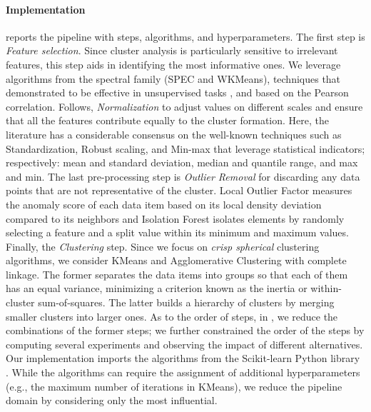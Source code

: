 \paragraph{Implementation}  reports the pipeline with steps, algorithms, and hyperparameters.
The first step is \textit{Feature selection}.
Since cluster analysis is particularly sensitive to irrelevant features, this step aids in identifying the most informative ones.
We leverage algorithms from the spectral family (SPEC and WKMeans), techniques that demonstrated to be effective in unsupervised tasks \cite{alelyani2018feature}, and based on the Pearson correlation.
Follows, \textit{Normalization} to adjust values on different scales and ensure that all the features contribute equally to the cluster formation.
Here, the literature has a considerable consensus on the well-known techniques such as Standardization, Robust scaling, and Min-max that leverage statistical indicators; respectively: mean and standard deviation, median and quantile range, and max and min.
The last pre-processing step is \textit{Outlier Removal} for discarding any data points that are not representative of the cluster.
Local Outlier Factor \cite{breunig2000lof} measures the anomaly score of each data item based on its local density deviation compared to its neighbors and Isolation Forest \cite{liu2012isolation} isolates elements by randomly selecting a feature and a split value within its minimum and maximum values.
Finally, the \textit{Clustering} step.
Since we focus on \textit{crisp spherical} clustering algorithms, we consider KMeans \cite{arthur2006k} and Agglomerative Clustering \cite{murtagh2017algorithms} with complete linkage.
The former separates the data items into groups so that each of them has an equal variance, minimizing a criterion known as the inertia or within-cluster sum-of-squares.
The latter builds a hierarchy of clusters by merging smaller clusters into larger ones.
As to the order of steps, in , we reduce the combinations of the former steps; we further constrained the order of the steps by computing several experiments and observing the impact of different alternatives.
Our implementation imports the algorithms from the Scikit-learn Python library \cite{scikit-learn}.
While the algorithms can require the assignment of additional hyperparameters (e.g., the maximum number of iterations in KMeans), we reduce the pipeline domain by considering only the most influential.

